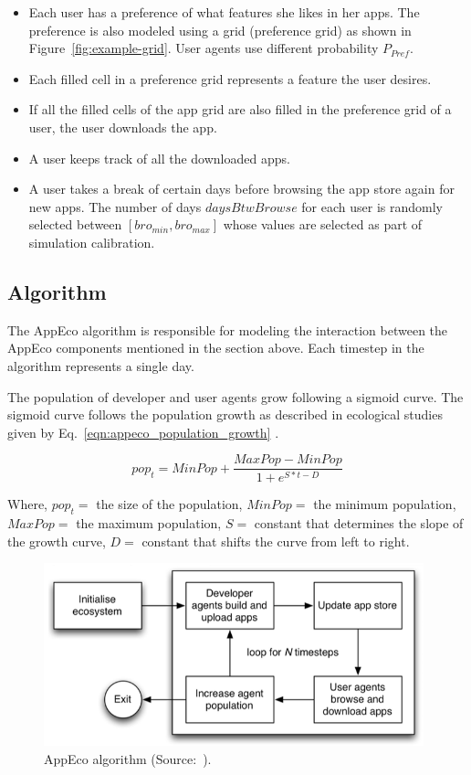 \begin{itemize}
  \item Each user has a preference of what features she likes in her apps. The preference is also modeled using a grid (preference grid) as shown in Figure~\ref{fig:example-grid}. User agents use different probability $P_{Pref}$.
  \item Each filled cell in a preference grid represents a feature the user desires.
  \item If all the filled cells of the app grid are also filled in the preference grid of a user, the user downloads the app.
  \item A user keeps track of all the downloaded apps.
  \item A user takes a break of certain days before browsing the app store again for new apps. The number of days $daysBtwBrowse$ for each user is randomly selected between $[bro_{min}, bro_{max}]$ whose values are selected as part of simulation calibration.
\end{itemize}

\subsection{Algorithm}

The AppEco algorithm is responsible for modeling the interaction between the AppEco components mentioned in the section above. Each timestep in the algorithm represents a single day.

The population of developer and user agents grow following a sigmoid curve. The sigmoid curve follows the population growth as described in ecological studies given by Eq.~\ref{eqn:appeco_population_growth} \cite{lim2012successful}.

\begin{equation}\label{eqn:appeco_population_growth}
  pop_t=MinPop+\frac{MaxPop-MinPop}{1+e^{S*t-D}}
\end{equation}

Where, 
$pop_t  =$ the size of the population,
$MinPop =$ the minimum population,
$MaxPop =$ the maximum population,
$S =$ constant that determines the slope of the growth curve,
$D =$ constant that shifts the curve from left to right.


\begin{figure}[!htb]
  \centering
  \includegraphics[width=11cm]{figures/appeco_algorithm.png}
  \caption{AppEco algorithm (Source:~\cite{lim2012successful}).}
  \label{fig:appeco-algorithm}
\end{figure}

